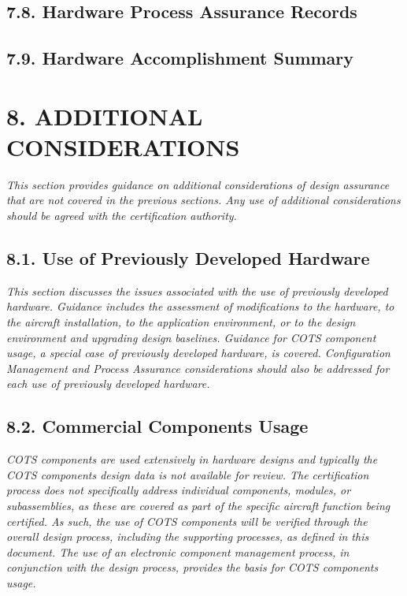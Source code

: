 \documentclass[]{article}
\begin{document}
\subsection{7.8. Hardware Process Assurance
Records}\label{hardware-process-assurance-records}

\subsection{7.9. Hardware Accomplishment
Summary}\label{hardware-accomplishment-summary}

\section{8. ADDITIONAL CONSIDERATIONS}\label{additional-considerations}

\emph{This section provides guidance on additional considerations of
design assurance that are not covered in the previous sections. Any use
of additional considerations should be agreed with the certification
authority.}

\subsection{8.1. Use of Previously Developed
Hardware}\label{use-of-previously-developed-hardware}

\emph{This section discusses the issues associated with the use of
previously developed hardware. Guidance includes the assessment of
modifications to the hardware, to the aircraft installation, to the
application environment, or to the design environment and upgrading
design baselines. Guidance for COTS component usage, a special case of
previously developed hardware, is covered. Configuration Management and
Process Assurance considerations should also be addressed for each use
of previously developed hardware.}

\subsection{8.2. Commercial Components
Usage}\label{commercial-components-usage}

\emph{COTS components are used extensively in hardware designs and
typically the COTS components design data is not available for review.
The certification process does not specifically address individual
components, modules, or subassemblies, as these are covered as part of
the specific aircraft function being certified. As such, the use of COTS
components will be verified through the overall design process,
including the supporting processes, as defined in this document. The use
of an electronic component management process, in conjunction with the
design process, provides the basis for COTS components usage.}
\end{document}
